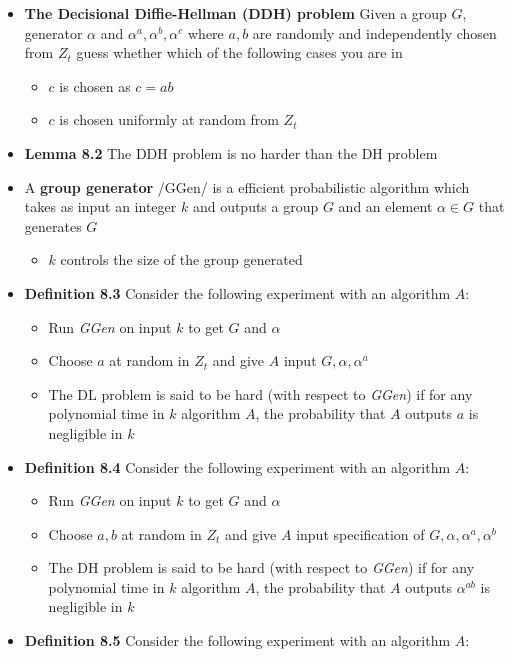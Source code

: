 \begin{itemize}
  \item \textbf{The Decisional Diffie-Hellman (DDH) problem} Given a group $G$, generator $\alpha$ and $\alpha^a, \alpha^b, \alpha^c$ where $a,b$ are randomly and independently chosen from $Z_t$ guess whether which of the following cases you are in
  \begin{itemize}
  	\item $c$ is chosen as $c=ab$
  	\item $c$ is chosen uniformly at random from $Z_t$
  \end{itemize}
  \item \textbf{Lemma 8.2} The DDH problem is no harder than the DH problem
  \item A \textbf{group generator} /GGen/ is a efficient probabilistic algorithm which takes as input an integer $k$ and outputs a group $G$ and an element $\alpha \in G$ that generates $G$
  \begin{itemize}
  	\item $k$ controls the size of the group generated
  \end{itemize}
  \item \textbf{Definition 8.3} Consider the following experiment with an algorithm $A$:
  \begin{itemize}
  	\item Run \textit{GGen} on input $k$ to get $G$ and $\alpha$
  	\item Choose $a$ at random in $Z_t$ and give $A$ input $G, \alpha, \alpha^a$
  	\item The DL problem is said to be hard (with respect to \textit{GGen}) if for any polynomial time in $k$ algorithm $A$, the probability that $A$ outputs $a$ is negligible in $k$
  \end{itemize}
  \item \textbf{Definition 8.4} Consider the following experiment with an algorithm $A$:
  \begin{itemize}
  	\item Run \textit{GGen} on input $k$ to get $G$ and $\alpha$
  	\item Choose $a,b$ at random in $Z_t$ and give $A$ input specification of $G, \alpha, \alpha^a, \alpha^b$
  	\item The DH problem is said to be hard (with respect to \textit{GGen}) if for any polynomial time in $k$ algorithm $A$, the probability that $A$ outputs $\alpha^{ab}$ is negligible in $k$
  \end{itemize}
  \item \textbf{Definition 8.5} Consider the following experiment with an algorithm $A$:

\end{itemize}
